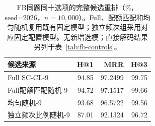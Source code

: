 \begin{table}[htbp]
\caption{FB同题同十选项的完整候选重排（\%，seed=2026，$n=10{,}000$）。Full、配额匹配和均匀随机复用既有固定模型；独立频次组采用对应固定配置模型。无新增选模；直接解码结果另列于表~\ref{tab:fb-controls}。}
\label{tab:fb-rerank}
\centering\small
\begin{tabular}{lrrr}
\toprule
候选来源 & H@1 & MRR & H@3 \\
\midrule
Full SC-CL-9 & 94.85 & 97.2499 & 99.75 \\
Full配额匹配随机-9 & 94.72 & 97.1517 & 99.66 \\
均匀随机-9 & 93.68 & 96.5722 & 99.56 \\
独立频次比例随机-9 & 87.01 & 92.1324 & 96.72 \\
\bottomrule
\end{tabular}
\end{table}
